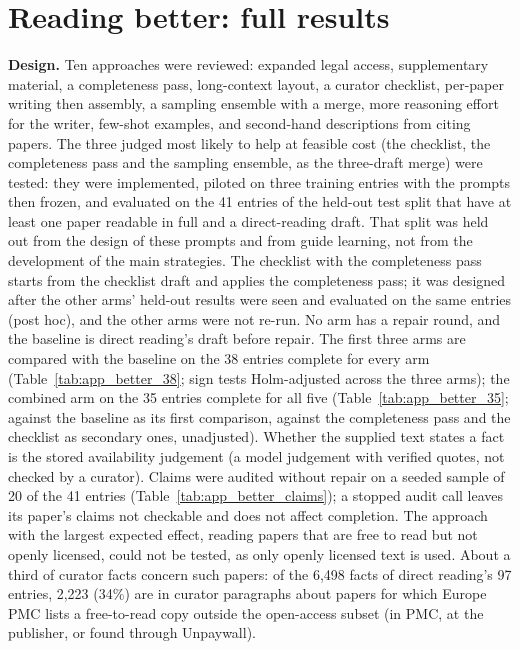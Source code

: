\documentclass{article} %
\begin{document}
\section{Reading better: full results}
\label{app:better}
\textbf{Design.} Ten approaches were reviewed: expanded legal access, supplementary material, a completeness pass, long-context layout, a curator checklist, per-paper writing then assembly, a sampling ensemble with a merge, more reasoning effort for the writer, few-shot examples, and second-hand descriptions from citing papers. The three judged most likely to help at feasible cost (the checklist, the completeness pass and the sampling ensemble, as the three-draft merge) were tested: they were implemented, piloted on three training entries with the prompts then frozen, and evaluated on the 41 entries of the held-out test split that have at least one paper readable in full and a direct-reading draft. That split was held out from the design of these prompts and from guide learning, not from the development of the main strategies. The checklist with the completeness pass starts from the checklist draft and applies the completeness pass; it was designed after the other arms' held-out results were seen and evaluated on the same entries (post hoc), and the other arms were not re-run. No arm has a repair round, and the baseline is direct reading's draft before repair. The first three arms are compared with the baseline on the 38 entries complete for every arm (Table~\ref{tab:app_better_38}; sign tests Holm-adjusted across the three arms); the combined arm on the 35 entries complete for all five (Table~\ref{tab:app_better_35}; against the baseline as its first comparison, against the completeness pass and the checklist as secondary ones, unadjusted). Whether the supplied text states a fact is the stored availability judgement (a model judgement with verified quotes, not checked by a curator). Claims were audited without repair on a seeded sample of 20 of the 41 entries (Table~\ref{tab:app_better_claims}); a stopped audit call leaves its paper's claims not checkable and does not affect completion. The approach with the largest expected effect, reading papers that are free to read but not openly licensed, could not be tested, as only openly licensed text is used. About a third of curator facts concern such papers: of the 6,498 facts of direct reading's 97 entries, 2,223 (34\%) are in curator paragraphs about papers for which Europe PMC lists a free-to-read copy outside the open-access subset (in PMC, at the publisher, or found through Unpaywall).
\end{document}
